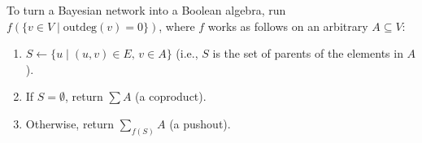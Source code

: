 \documentclass{article}
\theoremstyle{definition}
\theoremstyle{remark}
\begin{document}
To turn a Bayesian network into a Boolean algebra, run $f(\{ v \in V \mid
\mathrm{outdeg}(v) = 0 \})$, where $f$ works as follows on an arbitrary $A
\subseteq V$:
\begin{enumerate}
\item $S \gets \{ u \mid (u, v) \in E\text{, } v \in A \}$ (i.e., $S$ is the set
  of parents of the elements in $A$).
\item If $S = \emptyset$, return $\sum A$ (a coproduct).
\item Otherwise, return $\sum_{f(S)} A$ (a pushout).
\end{enumerate}



\end{document}
